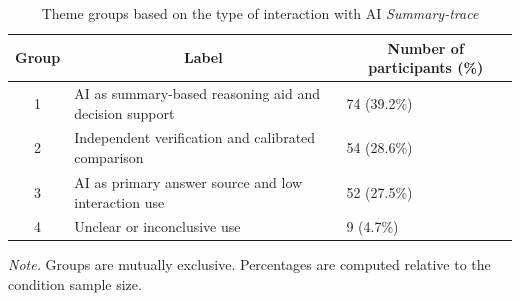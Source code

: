 \documentclass[manuscript, anonymous=false,authorversion,review=false]{acmart}
\begin{document}
\begin{table}[H]
\centering
\caption{Theme groups based on the type of interaction with AI \textit{Summary-trace}}
\begin{tabular}{cll}
\hline
Group & \multicolumn{1}{c}{Label}                            & \multicolumn{1}{c}{Number of participants (\%)} \\ \hline
1     & AI as summary-based reasoning aid and decision support & 74 (39.2\%)                                     \\
2     & Independent verification and calibrated comparison     & 54 (28.6\%)                                     \\
3     & AI as primary answer source and low interaction use    & 52 (27.5\%)                                     \\
4     & Unclear or inconclusive use              & 9 (4.7\%)  \\           
\hline
\end{tabular}

\label{tab:qualitative_C3}


\raggedright \small \textit{Note.} Groups are mutually exclusive. Percentages are computed relative to the condition sample size.
\end{table}
\end{document}
